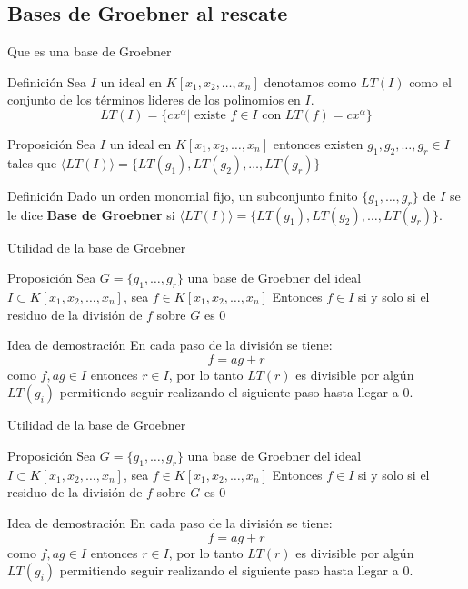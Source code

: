 \documentclass[10pt]{beamer}
\newcommand{\gen}[1]{\ensuremath{\langle #1\rangle}}
\begin{document}
\subsection{Bases de Groebner al rescate}

\begin{frame}{Que es una base de Groebner}
	\begin{block}{Definición}
		Sea $I$ un ideal en $K[x_1,x_2,\ldots,x_n]$ denotamos como $LT(I)$ como el conjunto de los términos lideres de los polinomios en $I$.
		$$LT(I) = \{cx^{\alpha} | \text{ existe } f \in I \text{ con } LT(f)=cx^{\alpha} \}$$
	\end{block}
	\pause
	\begin{block}{Proposición}
	Sea $I$ un ideal en $K[x_1,x_2,\ldots,x_n]$ entonces existen $g_1,g_2,\ldots,g_r \in I$ tales que
	$\gen{LT(I)} = \{ LT(g_1), LT(g_2), \ldots, LT(g_r)\}$
	\end{block}
	\pause
	\begin{block}{Definición}
		Dado un orden monomial fijo, un subconjunto finito $\{g_1,\ldots,g_r\}$ de $I$ se le dice \textbf{Base de Groebner} si $\gen{LT(I)} = \{ LT(g_1), LT(g_2), \ldots, LT(g_r)\}$.
	\end{block}
\end{frame}

\begin{frame}{Utilidad de la base de Groebner}
	\begin{block}{Proposición}
		Sea  $G=\{g_1,\ldots,g_r\}$ una base de Groebner del ideal $I \subset K[x_1,x_2,\ldots,x_n]$, sea $f \in K[x_1,x_2,\ldots,x_n]$ Entonces $f \in I$ si y solo si el residuo de la división de $f$ sobre $G$ es $0$
	\end{block}
	\pause
	\begin{block}{Idea de demostración}
		En cada paso de la división se tiene: $$f = ag + r$$como $f, ag \in I$ entonces $r \in I$, por lo tanto $LT(r)$ es divisible por algún $LT(g_i)$ permitiendo seguir realizando el siguiente paso hasta llegar a $0$.
	\end{block}
\end{frame}

\begin{frame}{Utilidad de la base de Groebner}
	\begin{block}{Proposición}
		Sea  $G=\{g_1,\ldots,g_r\}$ una base de Groebner del ideal $I \subset K[x_1,x_2,\ldots,x_n]$, sea $f \in K[x_1,x_2,\ldots,x_n]$ Entonces $f \in I$ si y solo si el residuo de la división de $f$ sobre $G$ es $0$
	\end{block}
	\pause
	\begin{block}{Idea de demostración}
		En cada paso de la división se tiene: $$f = ag + r$$como $f, ag \in I$ entonces $r \in I$, por lo tanto $LT(r)$ es divisible por algún $LT(g_i)$ permitiendo seguir realizando el siguiente paso hasta llegar a $0$.
	\end{block}
\end{frame}
\end{document}
